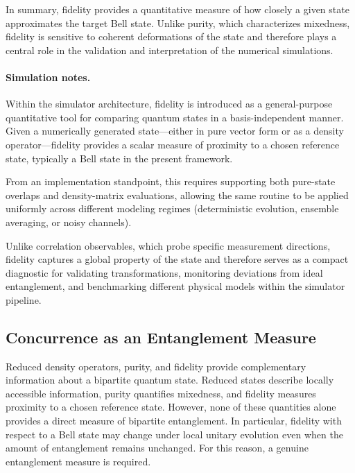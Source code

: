 \documentclass[a4paper]{article}
\begin{document}
\medskip

In summary, fidelity provides a quantitative measure of how closely a given state approximates the target Bell state. Unlike purity, which characterizes mixedness, fidelity is sensitive to coherent deformations of the state and therefore plays a central role in the validation and interpretation of the numerical simulations.

\paragraph{Simulation notes.}
Within the simulator architecture, fidelity is introduced as a general-purpose quantitative tool for comparing quantum states in a basis-independent manner. Given a numerically generated state—either in pure vector form or as a density operator—fidelity provides a scalar measure of proximity to a chosen reference state, typically a Bell state in the present framework. 

From an implementation standpoint, this requires supporting both pure-state overlaps and density-matrix evaluations, allowing the same routine to be applied uniformly across different modeling regimes (deterministic evolution, ensemble averaging, or noisy channels). 

Unlike correlation observables, which probe specific measurement directions, fidelity captures a global property of the state and therefore serves as a compact diagnostic for validating transformations, monitoring deviations from ideal entanglement, and benchmarking different physical models within the simulator pipeline.

\subsection{Concurrence as an Entanglement Measure}

Reduced density operators, purity, and fidelity provide complementary information about a bipartite quantum state. Reduced states describe locally accessible information, purity quantifies mixedness, and fidelity measures proximity to a chosen reference state. However, none of these quantities alone provides a direct measure of bipartite entanglement. In particular, fidelity with respect to a Bell state may change under local unitary evolution even when the amount of entanglement remains unchanged. For this reason, a genuine entanglement measure is required.
\end{document}
